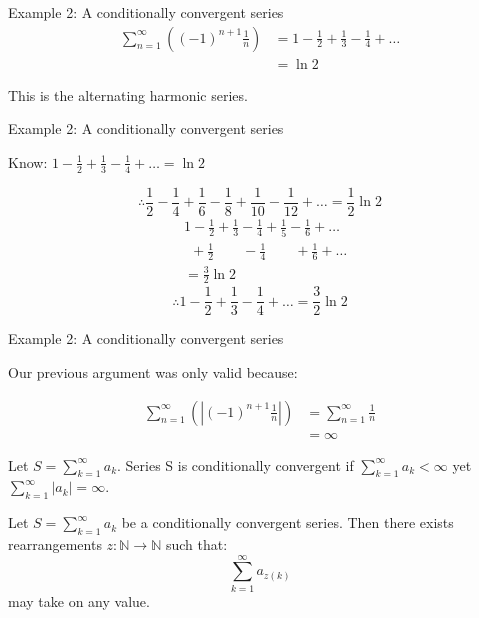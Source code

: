 \documentclass{beamer}
\begin{document}
\begin{frame}{Example 2: A conditionally convergent series}
    \begin{align*}
        \sum_{n=1}^{\infty}\left((-1)^{n+1}\frac{1}{n}\right)
        &=1-\frac{1}{2}+\frac{1}{3}-\frac{1}{4}+\dots \\
        &=\ln 2
    \end{align*}
    \begin{center}
        This is the alternating harmonic series.
    \end{center}
\end{frame}

\begin{frame}{Example 2: A conditionally convergent series}
    \begin{center}
        Know:
        $1-\frac{1}{2}+\frac{1}{3}-\frac{1}{4}+\dots=\ln 2$
    \end{center}
    $$\therefore \frac{1}{2}-\frac{1}{4}+\frac{1}{6}
    -\frac{1}{8}+\frac{1}{10}-\frac{1}{12}+\dots=\frac{1}{2}\ln 2$$
    \begin{align*}
        &1-\frac{1}{2}+\frac{1}{3}-\frac{1}{4}+\frac{1}{5}-\frac{1}{6}+\dots \\
        &\ \ +\frac{1}{2}\quad\quad-\frac{1}{4}\quad\quad+\frac{1}{6}+\dots \\
        &=\frac{3}{2}\ln 2
    \end{align*}
    $$\therefore 1-\frac{1}{2}+\frac{1}{3}-\frac{1}{4}+\dots=\frac{3}{2}\ln 2$$
\end{frame}

\begin{frame}{Example 2: A conditionally convergent series}
    \begin{center}
        Our previous argument was only valid because:
    \end{center}
    \begin{align*}
        \sum_{n=1}^{\infty}\left(|(-1)^{n+1}\frac{1}{n}|\right)
        &=\sum_{n=1}^{\infty}\frac{1}{n} \\
        &=\infty
    \end{align*}
\end{frame}

\begin{frame}
    \begin{definition}
        Let $S=\sum_{k=1}^{\infty}a_k$. Series S is
        conditionally convergent if $\sum_{k=1}^{\infty}a_k<\infty$
        yet $\sum_{k=1}^{\infty}|a_k|=\infty$.
    \end{definition}

    \begin{theorem}
        Let $S=\sum_{k=1}^{\infty}a_k$ be a conditionally
        convergent series. Then there exists rearrangements
        $z:\mathbb{N}\rightarrow\mathbb{N}$ such that:
        $$\sum_{k=1}^{\infty}a_{z(k)}$$
        may take on any value.
    \end{theorem}
\end{frame}
\end{document}
